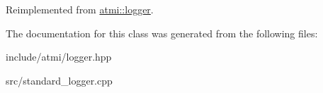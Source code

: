 Reimplemented from \hyperlink{classatmi_1_1logger_a5857a38d25d80a987ca1c7320bab1e74}{atmi\+::logger}.



The documentation for this class was generated from the following files\+:\begin{DoxyCompactItemize}
\item 
include/atmi/logger.\+hpp\item 
src/standard\+\_\+logger.\+cpp\end{DoxyCompactItemize}
